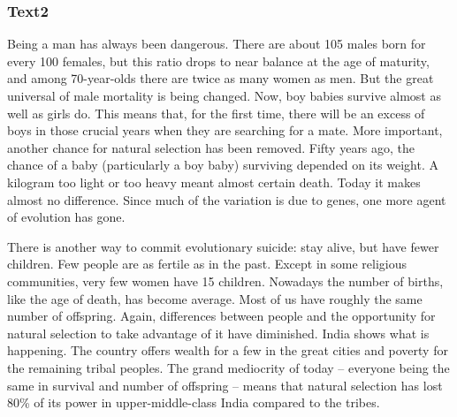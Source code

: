 \documentclass[a4paper]{article}
\begin{document}
\subsubsection{Text2}

\par
Being a man has always been dangerous. There are about 105 males born for every 100 females, but this ratio drops to near balance at the age of maturity, and among 70-year-olds there are twice as many women as men. But the great universal of male mortality is being changed. Now, boy babies survive almost as well as girls do. This means that, for the first time, there will be an excess of boys in those crucial years when they are searching for a mate. More important, another chance for natural selection has been removed. Fifty years ago, the chance of a baby (particularly a boy baby) surviving depended on its weight. A kilogram too light or too heavy meant almost certain death. Today it makes almost no difference. Since much of the variation is due to genes, one more agent of evolution has gone.

\par
There is another way to commit evolutionary suicide: stay alive, but have fewer children. Few people are as fertile as in the past. Except in some religious communities, very few women have 15 children. Nowadays the number of births, like the age of death, has become average. Most of us have roughly the same number of offspring. Again, differences between people and the opportunity for natural selection to take advantage of it have diminished. India shows what is happening. The country offers wealth for a few in the great cities and poverty for the remaining tribal peoples. The grand mediocrity of today -- everyone being the same in survival and number of offspring -- means that natural selection has lost 80\% of its power in upper-middle-class India compared to the tribes.
\end{document}
